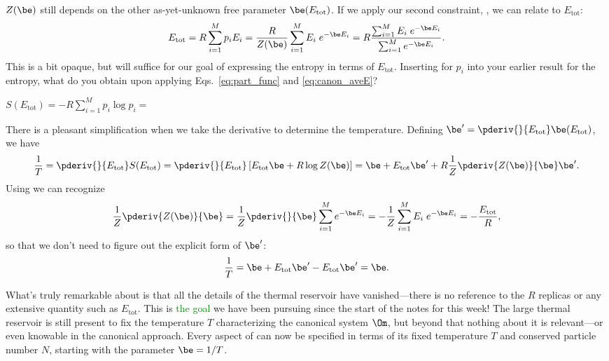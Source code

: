 $Z(\be)$ still depends on the other as-yet-unknown free parameter $\be(E_{\text{tot}})$.
If we apply our second constraint, , we can relate \be to $E_{\text{tot}}$:
\begin{equation}
  \label{eq:canon_aveE}
  E_{\text{tot}} = R \sum_{i = 1}^M p_i E_i = \frac{R}{Z(\be)} \sum_{i = 1}^M E_i \; e^{-\be E_i} = R \frac{\sum_{i = 1}^M E_i \; e^{-\be E_i}}{\sum_{i = 1}^M e^{-\be E_i}}.
\end{equation}
This is a bit opaque, but will suffice for our goal of expressing the entropy in terms of $E_{\text{tot}}$.
Inserting  for $p_i$ into your earlier result for the entropy, what do you obtain upon applying Eqs.~\ref{eq:part_func} and \ref{eq:canon_aveE}?
\begin{mdframed}
  $\displaystyle S(E_{\text{tot}}) = -R \sum_{i = 1}^M p_i \log p_i = $ \\[100 pt]
\end{mdframed}
There is a pleasant simplification when we take the derivative to determine the temperature.
Defining $\be' = \pderiv{}{E_{\text{tot}}} \be(E_{\text{tot}})$, we have
\begin{equation*}
  \frac{1}{T} = \pderiv{}{E_{\text{tot}}} S(E_{\text{tot}}) = \pderiv{}{E_{\text{tot}}} \left[E_{\text{tot}} \be + R\log Z(\be)\right] = \be + E_{\text{tot}} \be' + R \frac{1}{Z} \pderiv{Z(\be)}{\be} \be' .
\end{equation*}
Using  we can recognize
\begin{equation*}
  \frac{1}{Z} \pderiv{Z(\be)}{\be} = \frac{1}{Z} \pderiv{}{\be} \sum_{i = 1}^M e^{-\be E_i} = -\frac{1}{Z} \sum_{i = 1}^M E_i \; e^{-\be E_i} = -\frac{E_{\text{tot}}}{R},
\end{equation*}
so that we don't need to figure out the explicit form of $\be'$:
\begin{equation}
  \label{eq:beta}
  \frac{1}{T} = \be + E_{\text{tot}} \be' - E_{\text{tot}} \be' = \be .
\end{equation}

What's truly remarkable about  is that all the details of the thermal reservoir have vanished---there is no reference to the $R$ replicas or any extensive quantity such as $E_{\text{tot}}$.
This is \textcolor{green}{the goal} we have been pursuing since the start of the notes for this week!
The large thermal reservoir is still present to fix the temperature $T$ characterizing the canonical system $\Om$, but beyond that nothing about it is relevant---or even knowable in the canonical approach.
Every aspect of \Om can now be specified in terms of its fixed temperature $T$ and conserved particle number $N$, starting with the parameter $\be = 1 / T$.

